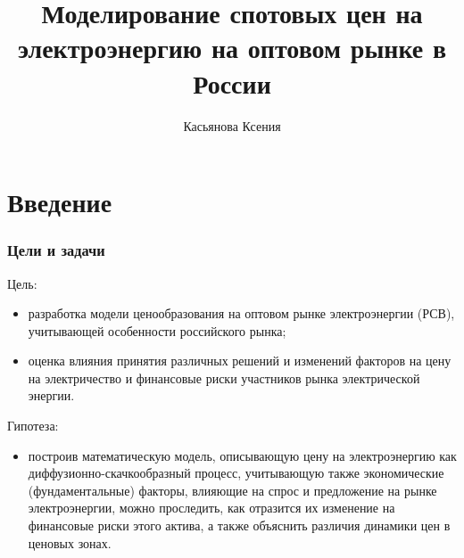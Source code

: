 \documentclass[c, dvipsnames]{beamer}  %
\title[   Моделирование цен на электричество ]{Моделирование спотовых цен на электроэнергию    на оптовом рынке  в России }
\author[Касьянова Ксения]{Касьянова Ксения \\ \smallskip \scriptsize  }
\institute[ИОРИ РАНХиГС]{ \uppercase{
  Институт отраслевых рынков и инфраструктуры}}
\date{}
\begin{document}
\frame[plain]{\titlepage}	%

\section{Введение}

\begin{frame}[shrink=3]
\frametitle{Цели и задачи} 



\begin{block}{Цель:}
	\begin{itemize}
		
		\item разработка модели ценообразования на оптовом рынке электроэнергии (РСВ), учитывающей особенности российского рынка; 
		
		\item оценка влияния принятия различных решений  и изменений факторов на цену на электричество и финансовые риски участников рынка электрической энергии. 
		
	\end{itemize}

	
\end{block}

\begin{block}{Гипотеза:}
	\begin{itemize}
		
		\item построив математическую  модель, описывающую  цену на электроэнергию как диффузионно-скачкообразный процесс,  учитывающую также экономические (фундаментальные) факторы, влияющие на спрос и предложение на рынке электроэнергии, можно  проследить, как отразится их изменение   на финансовые риски этого актива, а также объяснить различия динамики цен в ценовых зонах.
		
	
		
		
	\end{itemize}
\end{block}






\end{frame}
\end{document}

